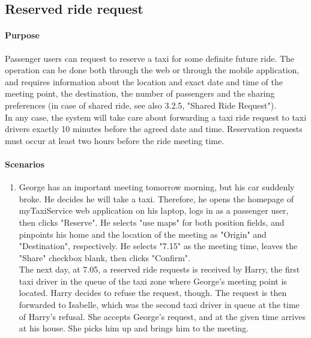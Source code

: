 \subsection{Reserved ride request}
	\paragraph{Purpose}
		Passenger users can request to reserve a taxi for some definite future ride. The operation can be done both through the web or through the mobile application, and requires information about the location and exact date and time of the meeting point, the destination, the number of passengers and the sharing preferences (in case of shared ride, see also 3.2.5, "Shared Ride Request").\\
		In any case, the system will take care about forwarding a taxi ride request to taxi drivers exactly 10 minutes before the agreed date and time. Reservation requests must occur at least two hours before the ride meeting time.
	
	\paragraph{Scenarios}
		\begin{enumerate}
			\item George has an important meeting tomorrow morning, but his car suddenly broke. He decides he will take a taxi. Therefore, he opens the homepage of myTaxiService web application on his laptop, logs in as a passenger user, then clicks "Reserve". He selects "use maps" for both position fields, and pinpoints his home and the location of the meeting as "Origin" and "Destination", respectively. He selects "7.15" as the meeting time, leaves the "Share" checkbox blank, then clicks "Confirm".\\
			The next day, at 7.05, a reserved ride requests is received by Harry, the first taxi driver in the queue of the taxi zone where George's meeting point is located. Harry decides to refuse the request, though. The request is then forwarded to Isabelle, which was the second taxi driver in queue at the time of Harry's refusal. She accepts George's request, and at the given time arrives at his house. She picks him up and brings him to the meeting.
		\end{enumerate}
	
